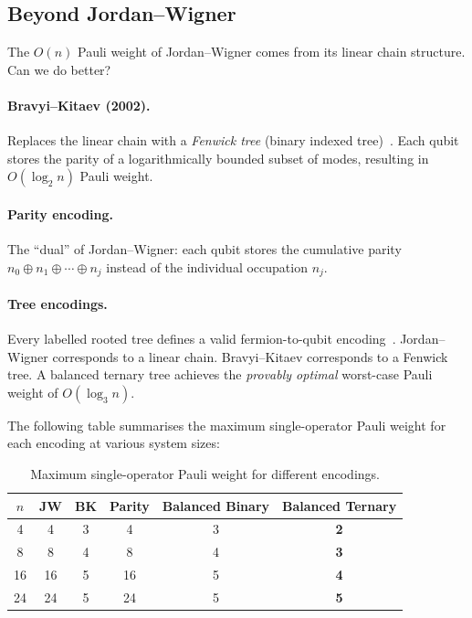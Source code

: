 \documentclass[aps,prb,preprint,longbibliography,nofootinbib]{revtex4-2}
\begin{document}
\subsection{Beyond Jordan--Wigner}

The $O(n)$ Pauli weight of Jordan--Wigner comes from its linear chain
structure.  Can we do better?

\paragraph{Bravyi--Kitaev (2002).}
Replaces the linear chain with a \emph{Fenwick tree} (binary indexed
tree)~\cite{bravyi2002,seeley2012}.  Each qubit stores the parity
of a logarithmically bounded subset of modes, resulting in
$O(\log_2 n)$ Pauli weight.

\paragraph{Parity encoding.}
The ``dual'' of Jordan--Wigner: each qubit stores the cumulative parity
$n_0 \oplus n_1 \oplus \cdots \oplus n_j$ instead of the individual
occupation $n_j$.

\paragraph{Tree encodings.}
Every labelled rooted tree defines a valid fermion-to-qubit
encoding~\cite{jiang2020}.  Jordan--Wigner corresponds to a linear
chain.  Bravyi--Kitaev corresponds to a Fenwick tree.  A balanced
ternary tree achieves the \emph{provably optimal} worst-case Pauli
weight of $O(\log_3 n)$.

The following table summarises the maximum single-operator Pauli weight
for each encoding at various system sizes:

\begin{table}[h]
\centering
\begin{tabular}{@{}cccccc@{}}
\toprule
$n$ & JW & BK & Parity & Balanced Binary & Balanced Ternary \\
\midrule
 4 &  4 & 3 &  4 & 3 & \textbf{2} \\
 8 &  8 & 4 &  8 & 4 & \textbf{3} \\
16 & 16 & 5 & 16 & 5 & \textbf{4} \\
24 & 24 & 5 & 24 & 5 & \textbf{5} \\
\bottomrule
\end{tabular}
\caption{Maximum single-operator Pauli weight for different encodings.}
\label{tab:weight-comparison}
\end{table}
\end{document}
